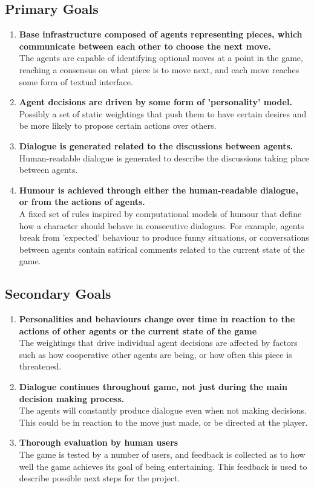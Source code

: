 \documentclass{article}
\newcommand\descitem[1]{\item{\bfseries #1}\\}
\begin{document}
\subsection*{Primary Goals}
\begin{enumerate}
		\descitem{Base infrastructure composed of agents representing pieces, which communicate between each other to choose the next move.}
		The agents are capable of identifying optional moves at a point in the game, reaching a consensus on what piece is to move next, and each move reaches some form of textual interface.

		\descitem{Agent decisions are driven by some form of 'personality' model.}
		Possibly a set of static weightings that push them to have certain desires and be more likely to propose certain actions over others.

		\descitem{Dialogue is generated related to the discussions between agents.}
		Human-readable dialogue is generated to describe the discussions taking place between agents.

		\descitem{Humour is achieved through either the human-readable dialogue, or from the actions of agents.}
		A fixed set of rules inspired by computational models of humour that define how a character should behave in consecutive dialogues. For example, agents break from 'expected' behaviour to produce funny situations, or conversations between agents contain satirical comments related to the current state of the game.

\end{enumerate}

\subsection*{Secondary Goals}

\begin{enumerate}
		\descitem{Personalities and behaviours change over time in reaction to the actions of other agents or the current state of the game}
		The weightings that drive individual agent decisions are affected by factors such as how cooperative other agents are being, or how often this piece is threatened.

		\descitem{Dialogue continues throughout game, not just during the main decision making process.}
		The agents will constantly produce dialogue even when not making decisions. This could be in reaction to the move just made, or be directed at the player.

		\descitem{Thorough evaluation by human users}
		The game is tested by a number of users, and feedback is collected as to how well the game achieves its goal of being entertaining. This feedback is used to describe possible next steps for the project.

\end{enumerate}
\end{document}
